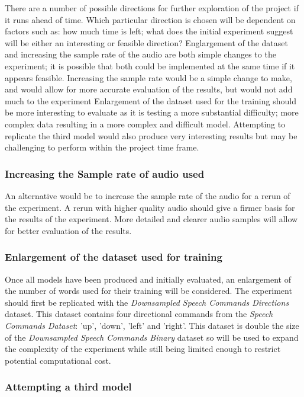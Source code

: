 \documentclass[titlepage]{article}
\begin{document}
There are a number of possible directions for further exploration of the project if it runs ahead of time.
Which particular direction is chosen will be dependent on factors such as: how much time is left; what does the initial experiment suggest will be either an interesting or feasible direction?
Englargement of the dataset and increasing the sample rate of the audio are both simple changes to the experiment; it is possible that both could be implemented at the same time if it appears feasible.
Increasing the sample rate would be a simple change to make, and would allow for more accurate evaluation of the results, but would not add much to the experiment
Enlargement of the dataset used for the training should be more interesting to evaluate as it is testing a more substantial difficulty; more complex data resulting in a more complex and difficult model.
Attempting to replicate the third model would also produce very interesting results but may be challenging to perform within the project time frame.

\subsubsection{Increasing the Sample rate of audio used}

An alternative would be to increase the sample rate of the audio for a rerun of the experiment.
A rerun with higher quality audio should give a firmer basis for the results of the experiment.
More detailed and clearer audio samples will allow for better evaluation of the results.

\subsubsection{Enlargement of the dataset used for training}

Once all models have been produced and initially evaluated, an enlargement of the number of words used for their training will be considered.
The experiment should first be replicated with the \textit{Downsampled Speech Commands Directions} dataset.
  This dataset contains four directional commands from the \textit{Speech Commands Dataset}: 'up', 'down', 'left' and 'right'.
  This dataset is double the size of the \textit{Downsampled Speech Commands Binary} dataset so will be used to expand the complexity of the experiment while still being limited enough to restrict potential computational cost.

\subsubsection{Attempting a third model}
  
\end{document}
